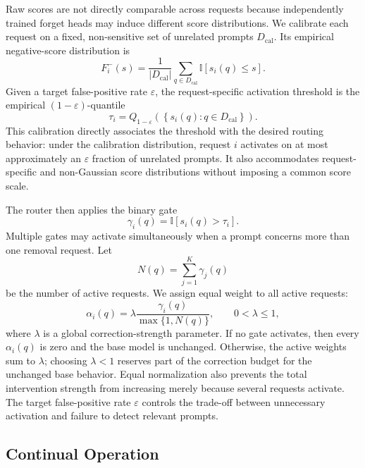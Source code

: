 \documentclass[11pt]{article}
\begin{document}
Raw scores are not directly comparable across requests because independently trained forget heads may induce different score distributions. We calibrate each request on a fixed, non-sensitive set of unrelated prompts $D_{\mathrm{cal}}$. Its empirical negative-score distribution is
\begin{equation}
    F_i^-(s)
    =\frac{1}{|D_{\mathrm{cal}}|}
    \sum_{q\in D_{\mathrm{cal}}}
    \mathbb{I}\left[s_i(q)\leq s\right].
\end{equation}
Given a target false-positive rate $\varepsilon$, the request-specific activation threshold is the empirical $(1-\varepsilon)$-quantile
\begin{equation}
    \tau_i
    =Q_{1-\varepsilon}
    \left(\left\{s_i(q):q\in D_{\mathrm{cal}}\right\}\right).
\end{equation}
This calibration directly associates the threshold with the desired routing behavior: under the calibration distribution, request $i$ activates on at most approximately an $\varepsilon$ fraction of unrelated prompts. It also accommodates request-specific and non-Gaussian score distributions without imposing a common score scale.

The router then applies the binary gate
\begin{equation}
    \gamma_i(q)=\mathbb{I}
    \left[s_i(q)>\tau_i\right].
\end{equation}
Multiple gates may activate simultaneously when a prompt concerns more than one removal request. Let
\begin{equation}
    N(q)=\sum_{j=1}^{K}\gamma_j(q)
\end{equation}
be the number of active requests. We assign equal weight to all active requests:
\begin{equation}
    \alpha_i(q)
    =\lambda\frac{\gamma_i(q)}{\max\{1,N(q)\}},
    \qquad 0<\lambda\leq1,
\end{equation}
where $\lambda$ is a global correction-strength parameter. If no gate activates, then every $\alpha_i(q)$ is zero and the base model is unchanged. Otherwise, the active weights sum to $\lambda$; choosing $\lambda<1$ reserves part of the correction budget for the unchanged base behavior. Equal normalization also prevents the total intervention strength from increasing merely because several requests activate. The target false-positive rate $\varepsilon$ controls the trade-off between unnecessary activation and failure to detect relevant prompts.

\subsection{Continual Operation}
\end{document}
